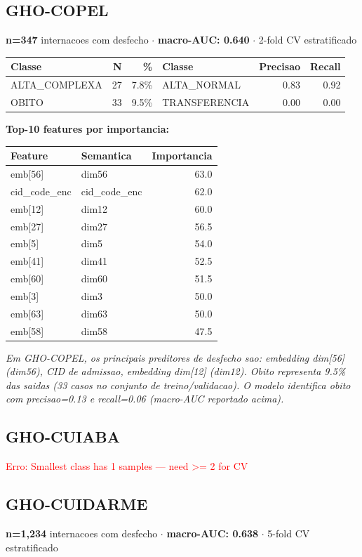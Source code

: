 \documentclass[11pt,a4paper]{article}
\begin{document}
\subsection{GHO-COPEL}
\textbf{n=347} internacoes com desfecho $\cdot$ \textbf{macro-AUC: 0.640} $\cdot$ 2-fold CV estratificado

\begin{tabular}{lrr|lrr}
\toprule
Classe & N & \% & Classe & Precisao & Recall \\
\midrule
ALTA\_COMPLEXA & 27 & 7.8\% & ALTA\_NORMAL & 0.83 & 0.92 \\
OBITO & 33 & 9.5\% & TRANSFERENCIA & 0.00 & 0.00 \\
\bottomrule
\end{tabular}

\vspace{4pt}\noindent\textbf{Top-10 features por importancia:}

\begin{tabular}{llr}
\toprule
Feature & Semantica & Importancia \\
\midrule
emb[56] & dim56 & 63.0 \\
cid\_code\_enc & cid\_code\_enc & 62.0 \\
emb[12] & dim12 & 60.0 \\
emb[27] & dim27 & 56.5 \\
emb[5] & dim5 & 54.0 \\
emb[41] & dim41 & 52.5 \\
emb[60] & dim60 & 51.5 \\
emb[3] & dim3 & 50.0 \\
emb[63] & dim63 & 50.0 \\
emb[58] & dim58 & 47.5 \\
\bottomrule
\end{tabular}

\vspace{4pt}\noindent\textit{Em GHO-COPEL, os principais preditores de desfecho sao: embedding dim[56] (dim56), CID de admissao, embedding dim[12] (dim12). Obito representa 9.5\% das saidas (33 casos no conjunto de treino/validacao). O modelo identifica obito com precisao=0.13 e recall=0.06 (macro-AUC reportado acima).}

\subsection{GHO-CUIABA}
\textcolor{red}{Erro: Smallest class has 1 samples — need >= 2 for CV}

\subsection{GHO-CUIDARME}
\textbf{n=1,234} internacoes com desfecho $\cdot$ \textbf{macro-AUC: 0.638} $\cdot$ 5-fold CV estratificado
\end{document}
